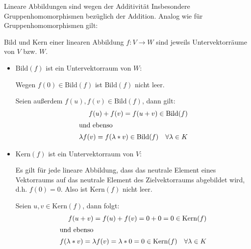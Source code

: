 Lineare Abbildungen sind wegen der Additivität Insbesondere Gruppenhomomorphismen bezüglich der Addition. Analog wie für Gruppenhomomorphismen gilt:

\begin{satz}{}
  Bild und Kern einer linearen Abbildung $f:V\rightarrow W$ sind jeweils Untervektorräume von $V$ bzw. $W$.
\end{satz}

\beweis
\begin{itemize}
	\item $\mathrm{Bild}(f)$ ist ein Untervektorraum von $W$:

	Wegen $f(0)\in\mathrm{Bild}(f)$ ist $\mathrm{Bild}(f)$ nicht leer.

	Seien außerdem $f(u),f(v)\in\mathrm{Bild}(f)$, dann gilt:
	\begin{align*}
		f(u)+f(v)=f(u+v)\in\mathrm{Bild}(f)\\
		\intertext{und ebenso}
		\lambda f(v)=f(\lambda*v)\in\mathrm{Bild}(f) \quad \forall\lambda\in K
	\end{align*}

	\item $\mathrm{Kern}(f)$ ist ein Untervektorraum von $V$:

	Es gilt für jede lineare Abbildung, dass das neutrale Element eines Vektorraums auf das neutrale Element des Zielvektorraums abgebildet wird, d.h. $f(0)=0$. Also ist $\mathrm{Kern}(f)$ nicht leer.

	Seien $u,v\in \mathrm{Kern}(f)$, dann folgt:
	\begin{align*}
		f(u+v)=f(u)+f(v)=0+0=0 \in\mathrm{Kern}(f)\\
		\intertext{und ebenso}
		f(\lambda *v)=\lambda f(v)=\lambda*0=0\in\mathrm{Kern}(f) \quad\forall \lambda\in K
	\end{align*}
\end{itemize}


